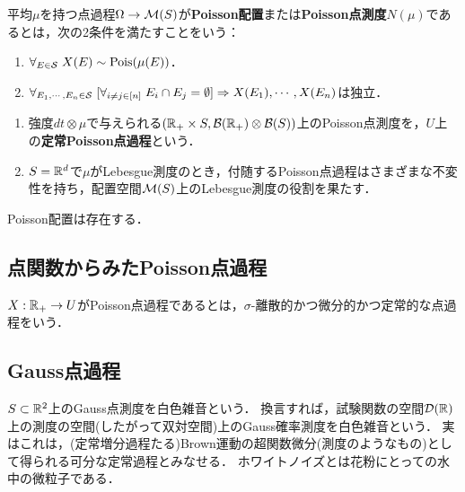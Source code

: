\documentclass[uplatex,dvipdfmx]{jsreport}
\begin{document}
\begin{definition}
    平均$\mu$を持つ点過程$\Om\to\M(S)$が\textbf{Poisson配置}または\textbf{Poisson点測度}$N(\mu)$であるとは，次の2条件を満たすことをいう：
    \begin{enumerate}
        \item $\forall_{E\in\S}\;X(E)\sim\Pois(\mu(E))$．
        \item $\forall_{E_1,\cdots,E_n\in\S}\;[\forall_{i\ne j\in[n]}\;E_i\cap E_j=\emptyset]\Rightarrow X(E_1),\cdots,X(E_n)$は独立．
    \end{enumerate}
\end{definition}
\begin{example}\mbox{}
    \begin{enumerate}
        \item 強度$dt\otimes \mu$で与えられる$(\R_+\times S,\B(\R_+)\otimes\B(S))$上のPoisson点測度を，$U$上の\textbf{定常Poisson点過程}という．
        \item $S=\R^d$で$\mu$がLebesgue測度のとき，付随するPoisson点過程はさまざまな不変性を持ち，配置空間$\M(S)$上のLebesgue測度の役割を果たす．
    \end{enumerate}
\end{example}

\begin{theorem}[Poisson点過程の存在]
    Poisson配置は存在する．
\end{theorem}

\subsection{点関数からみたPoisson点過程}

\begin{definition}
    $X:\R_+\to U$がPoisson点過程であるとは，$\sigma$-離散的かつ微分的かつ定常的な点過程をいう．
\end{definition}

\subsection{Gauss点過程}

\begin{tcolorbox}[colframe=ForestGreen, colback=ForestGreen!10!white,breakable,colbacktitle=ForestGreen!40!white,coltitle=black,fonttitle=\bfseries\sffamily,
title=]
    $S\subset\R^2$上のGauss点測度を白色雑音という．
    換言すれば，試験関数の空間$\D(\R)$上の測度の空間(したがって双対空間)上のGauss確率測度を白色雑音という．
    実はこれは，(定常増分過程たる)Brown運動の超関数微分(測度のようなもの)として得られる可分な定常過程とみなせる．
    ホワイトノイズとは花粉にとっての水中の微粒子である．
\end{tcolorbox}
\end{document}
